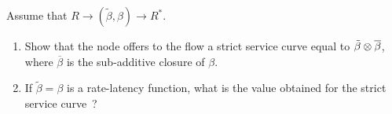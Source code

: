 \begin{problem}
Assume that $R \rightarrow (\tilde{\beta}, \beta) \rightarrow
R^*$.
\begin{enumerate}
  \item Show that the node offers to the flow a strict service
curve equal to $\tilde{\beta}\otimes \overline{\beta}$, where
$\overline{\beta}$ is the sub-additive closure of $\beta$.
  \item If $\tilde{\beta}=\beta$ is a rate-latency function, what is the
  value obtained for the strict service curve~?
\end{enumerate}
\end{problem}
